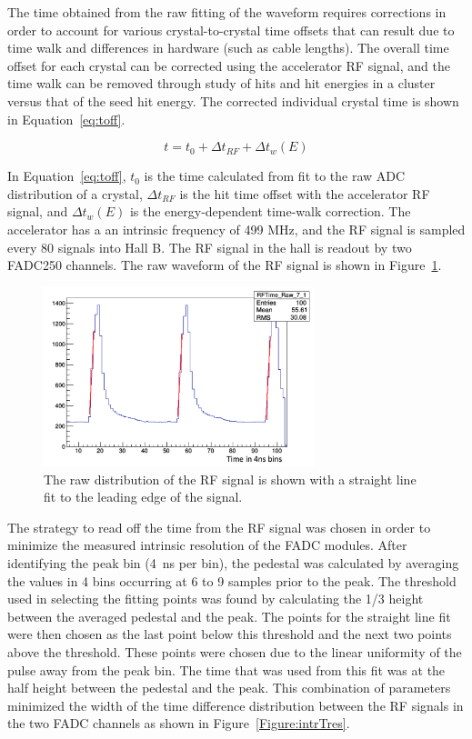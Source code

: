 The time obtained from the raw fitting of the waveform requires corrections in order to account for various crystal-to-crystal time offsets that can result due to time walk and differences in hardware (such as cable lengths). The overall time offset for each crystal can be corrected using the accelerator RF signal, and the time walk can be removed through study of hits and hit energies in a cluster versus that of the seed hit energy. The corrected individual crystal time is shown in Equation~\eqref{eq:toff}.

\begin{equation}
	\label{eq:toff}
	t = t_0 +\Delta t_{RF} + \Delta t_w (E)
\end{equation}

In Equation~\eqref{eq:toff}, $t_0$ is the time calculated from fit to the raw ADC distribution of a crystal, $\Delta t_{RF}$ is the hit time offset with the accelerator RF signal, and $\Delta t_w(E)$ is the energy-dependent time-walk correction. The accelerator has a an intrinsic frequency of 499 MHz, and the RF signal is sampled every 80 signals into Hall B. The RF signal in the hall is readout by two FADC250 channels. The raw waveform of the RF signal is shown in Figure~\ref{Figure:rfFits}. 

\begin{figure}[H]
  \centering
      \includegraphics[width=0.7\textwidth]{pics/performance/rfFits.png}
  \caption[Fitted, raw waveform of the RF signal in HPS]{The raw distribution of the RF signal is shown with a straight line fit to the leading edge of the signal.}
  \label{Figure:rfFits}
\end{figure}

The strategy to read off the time from the RF signal was chosen in order to minimize the measured intrinsic resolution of the FADC modules. After identifying the peak bin (4~ns per bin), the pedestal was calculated by
averaging the values in 4 bins occurring at 6 to 9 samples prior to the peak. The threshold used in selecting the fitting points was found by calculating the 1/3 height between the averaged pedestal and the peak. The points for the straight line fit were then chosen as the last point below this threshold and the next two points above the threshold. These points were chosen due to the linear uniformity of the pulse away from the
peak bin. The time that was used from this fit was at the half height between the pedestal and the peak. This combination of parameters minimized the width of the time difference distribution between the RF signals in the two FADC channels as shown in Figure~\ref{Figure:intrTres}. 

